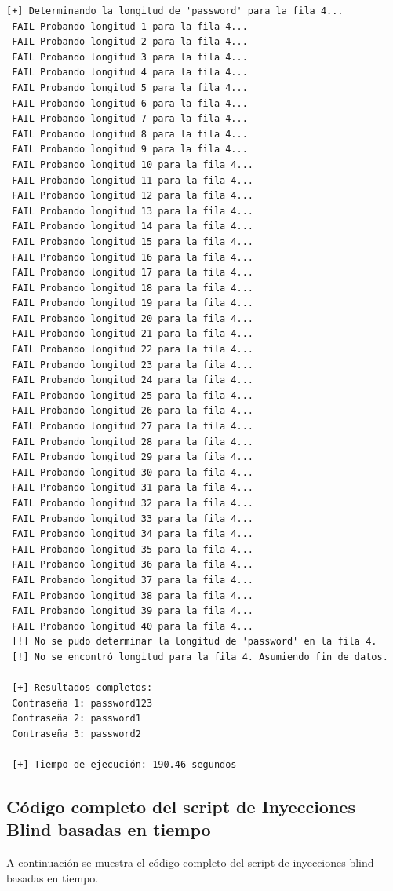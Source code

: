 \documentclass[a4paper,12pt]{article}
\begin{document}
\begin{lstlisting}[style=console, basicstyle=\ttfamily\footnotesize]
 [+] Determinando la longitud de 'password' para la fila 4...
 FAIL Probando longitud 1 para la fila 4...
 FAIL Probando longitud 2 para la fila 4...
 FAIL Probando longitud 3 para la fila 4...
 FAIL Probando longitud 4 para la fila 4...
 FAIL Probando longitud 5 para la fila 4...
 FAIL Probando longitud 6 para la fila 4...
 FAIL Probando longitud 7 para la fila 4...
 FAIL Probando longitud 8 para la fila 4...
 FAIL Probando longitud 9 para la fila 4...
 FAIL Probando longitud 10 para la fila 4...
 FAIL Probando longitud 11 para la fila 4...
 FAIL Probando longitud 12 para la fila 4...
 FAIL Probando longitud 13 para la fila 4...
 FAIL Probando longitud 14 para la fila 4...
 FAIL Probando longitud 15 para la fila 4...
 FAIL Probando longitud 16 para la fila 4...
 FAIL Probando longitud 17 para la fila 4...
 FAIL Probando longitud 18 para la fila 4...
 FAIL Probando longitud 19 para la fila 4...
 FAIL Probando longitud 20 para la fila 4...
 FAIL Probando longitud 21 para la fila 4...
 FAIL Probando longitud 22 para la fila 4...
 FAIL Probando longitud 23 para la fila 4...
 FAIL Probando longitud 24 para la fila 4...
 FAIL Probando longitud 25 para la fila 4...
 FAIL Probando longitud 26 para la fila 4...
 FAIL Probando longitud 27 para la fila 4...
 FAIL Probando longitud 28 para la fila 4...
 FAIL Probando longitud 29 para la fila 4...
 FAIL Probando longitud 30 para la fila 4...
 FAIL Probando longitud 31 para la fila 4...
 FAIL Probando longitud 32 para la fila 4...
 FAIL Probando longitud 33 para la fila 4...
 FAIL Probando longitud 34 para la fila 4...
 FAIL Probando longitud 35 para la fila 4...
 FAIL Probando longitud 36 para la fila 4...
 FAIL Probando longitud 37 para la fila 4...
 FAIL Probando longitud 38 para la fila 4...
 FAIL Probando longitud 39 para la fila 4...
 FAIL Probando longitud 40 para la fila 4...
 [!] No se pudo determinar la longitud de 'password' en la fila 4.
 [!] No se encontró longitud para la fila 4. Asumiendo fin de datos.
 
 [+] Resultados completos:
 Contraseña 1: password123
 Contraseña 2: password1
 Contraseña 3: password2
 
 [+] Tiempo de ejecución: 190.46 segundos 
\end{lstlisting}

\subsection{Código completo del script de Inyecciones Blind basadas en tiempo}
A continuación se muestra el código completo del script de inyecciones blind basadas en tiempo.
\end{document}
